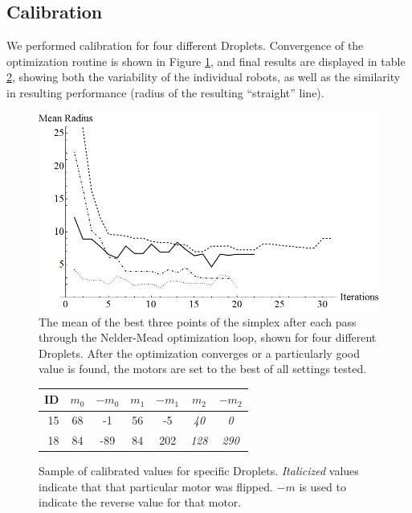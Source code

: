 \documentclass[letterpaper, 10pt, conference]{ieeeconf}
\begin{document}
\subsection{Calibration}
We performed calibration for four different Droplets. Convergence of the optimization routine is shown in Figure \ref{fig:radiiConverging}, and final results are displayed in table \ref{DropletValueTable}, showing both the variability of the individual robots, as well as the similarity in resulting performance (radius of the resulting ``straight'' line).

\begin{figure}[!htb]
\centering
\includegraphics[width=\linewidth]{Images/radiiConverging.png}
\caption{The mean of the best three points of the simplex after each pass through the Nelder-Mead optimization loop, shown for four different Droplets. After the optimization converges or a particularly good value is found, the motors are set to the best of all settings tested.}
\label{fig:radiiConverging}
\end{figure}

\begin{figure}
\centering
\begin{tabular}{r|c|c|c|c|c|c}
 ID & $m_0$ & $-m_0$ & $m_1$ & $-m_1$ & $m_2$ & $-m_2$ \\
\hline
15 & 68 & -1 & 56 & -5 & \emph{40} & \emph{0}\\ 
18 & 84 & -89 & 84 & 202 & \emph{128}  & \emph{290}\\
\end{tabular}
\caption{Sample of calibrated values for specific Droplets. \emph{Italicized} values indicate that that particular motor was flipped. $-m$ is used to indicate the reverse value for that motor.}
\label{DropletValueTable}
\end{figure}
\end{document}
